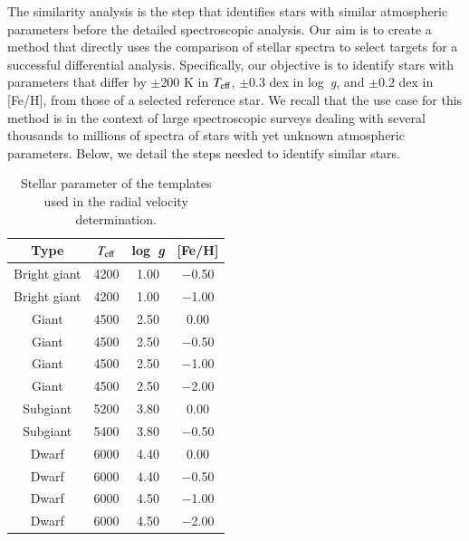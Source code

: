 \documentclass{aa}
\def\teff{$\textit{T}_{\rm{eff}}$}
\def\logg{\mbox{log~{\it g}}}
\begin{document}
The similarity analysis is the step that identifies stars with similar atmospheric parameters before the detailed spectroscopic analysis. Our aim is to create a method that directly uses the comparison of stellar spectra to select targets for a successful differential analysis. Specifically, our objective is to identify stars with parameters that differ by $\pm$200 K in \teff, $\pm$0.3 dex in \logg, and $\pm$0.2 dex in [Fe/H], from those of a selected reference star. We recall that the use case for this method is in the context of large spectroscopic surveys dealing with several thousands to millions of spectra of stars with yet unknown atmospheric parameters. Below, we detail the steps needed to identify similar stars. 

\begin{table}
\caption{Stellar parameter of the templates used in the radial velocity determination.}            
\label{tab:templates4rv}      
\centering                          
\begin{tabular}{c c c c}        
\hline\hline                 
Type & \teff & \logg & [Fe/H] \\    
\hline                        
Bright giant      & 4200          & 1.00          & $-$0.50        \\
Bright giant      & 4200          & 1.00          & $-$1.00        \\
Giant             & 4500          & 2.50          & 0.00         \\
Giant             & 4500          & 2.50          & $-$0.50        \\
Giant             & 4500          & 2.50          & $-$1.00        \\
Giant             & 4500          & 2.50          & $-$2.00        \\
Subgiant          & 5200          & 3.80          & 0.00         \\
Subgiant          & 5400          & 3.80          & $-$0.50        \\
Dwarf             & 6000          & 4.40          & 0.00         \\
Dwarf             & 6000          & 4.40          & $-$0.50        \\
Dwarf             & 6000          & 4.50          & $-$1.00        \\
Dwarf             & 6000          & 4.50          & $-$2.00        \\
\hline                                   
\end{tabular}
\end{table}
\end{document}
